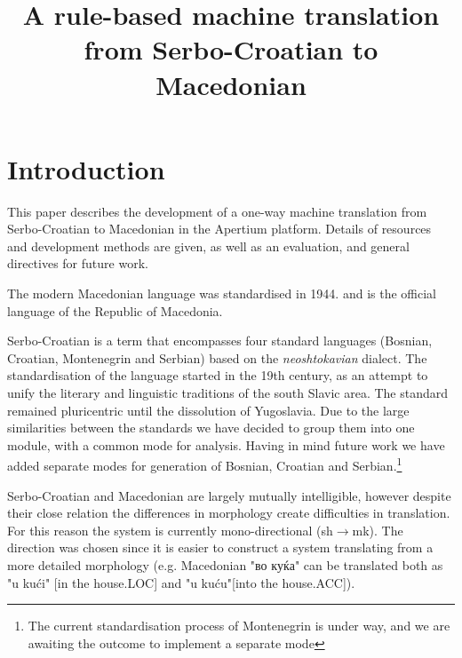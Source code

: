 \documentclass{book}
\title{A rule-based machine translation from Serbo-Croatian to Macedonian}
\begin{document}
\frontmatter      %

\maketitle

\setcounter{page}{5}
\setcounter{tocdepth}{0}  %

\chapter{Introduction}

This paper describes the development of a one-way machine translation
from Serbo-Croatian to Macedonian in the Apertium platform.
Details of resources and development methods are given, as well as an
evaluation, and general directives for future work.

The modern Macedonian language was standardised in 1944. and
is the official language of the Republic of Macedonia.

Serbo-Croatian is a term that encompasses four standard languages 
(Bosnian, Croatian, Montenegrin and Serbian) based on the 
\emph{neoshtokavian} dialect. The standardisation of the language started
in the 19th century, as an attempt to unify the literary and linguistic 
traditions of the south Slavic area. The standard remained pluricentric
until the dissolution of Yugoslavia. Due to the large similarities between 
the standards we have decided to group them into one module, with a common
mode for analysis. Having in mind future work we have added separate modes 
for generation of Bosnian, Croatian and Serbian.\footnote{The current standardisation
process of Montenegrin is under way, and we are awaiting the outcome to implement a separate
mode}

Serbo-Croatian and Macedonian are largely mutually intelligible, however despite their close relation the differences in morphology 
create difficulties in translation. For this reason the system is currently mono-directional (sh$\rightarrow$mk). 
The direction was chosen since it is easier to construct a system translating from a more detailed morphology 
(e.g. Macedonian "во куќа" can be translated both as "u kući" [in the house.LOC] and "u kuću"[into the house.ACC]).
\end{document}
